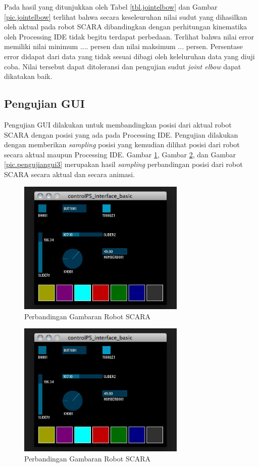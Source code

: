  Pada hasil yang ditunjukkan oleh Tabel \ref{tbl.jointelbow} dan Gambar \ref{pic.jointelbow} terlihat bahwa secara keseleuruhan nilai sudut yang dihasilkan oleh aktual pada robot SCARA dibandingkan dengan perhitungan kinematika oleh Processing IDE tidak begitu terdapat perbedaan. Terlihat bahwa nilai error
 memiliki nilai minimum .... persen dan nilai maksimum ... persen. Persentase error didapat dari data yang tidak sesuai dibagi oleh keleluruhan data yang diuji coba. Nilai tersebut dapat ditoleransi dan pengujian sudut \textit{joint elbow} dapat dikatakan baik.
 \subsection{Pengujian GUI}
 Pengujian GUI dilakukan untuk membandingkan posisi dari aktual robot SCARA dengan posisi yang ada pada Processing IDE. Pengujian dilakukan dengan memberikan \textit{sampling} posisi yang kemudian dilihat posisi dari robot secara aktual maupun Processing IDE. Gambar \ref{pic.pengujiangui1}, Gambar \ref{pic.pengujiangui2}, dan Gambar \ref{pic.pengujiangui3} merupakan hasil \textit{sampling} perbandingan posisi dari robot SCARA secara aktual dan secara animasi.
  \begin{figure}[H]
 	\centering
 	\includegraphics[width=8cm]{gambar/controlp5.jpg}
 	\caption{Perbandingan Gambaran Robot SCARA}
 	\label{pic.pengujiangui1}
 \end{figure}
\begin{figure}[H]
	\centering
	\includegraphics[width=8cm]{gambar/controlp5.jpg}
	\caption{Perbandingan Gambaran Robot SCARA}
	\label{pic.pengujiangui2}
\end{figure}
